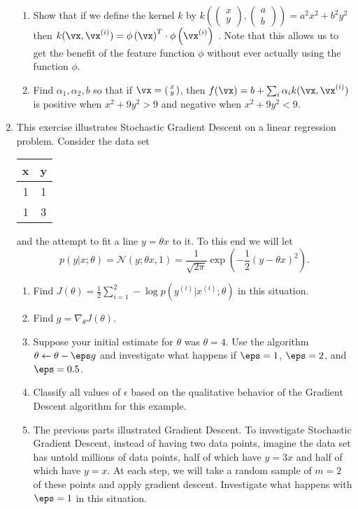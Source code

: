 \documentclass{article}
\begin{document}
\begin{enumerate}
\begin{enumerate}
    \item Show that if we define the kernel $k$ by $k\left( 
                                                     \left( \begin{smallmatrix} x \\ y \end{smallmatrix} \right),
                                                     \left( \begin{smallmatrix} a \\ b \end{smallmatrix} \right) \right)
                            = a^2x^2 + b^2y^2$ then $k(\vx, \vx^{(i)}) = \phi\left(\vx\right)^T \cdot \phi\left(\vx^{(i)}\right)$ . Note that this allows us to get the benefit of the feature function $\phi$ without ever actually using the function $\phi$.
    \item Find $\alpha_1, \alpha_2, b$ so that if $\vx = \left( \begin{smallmatrix} x \\ y \end{smallmatrix} \right)$, 
          then $f(\vx) = b + \sum_i \alpha_i k( \vx , \vx^{(i)})$ is positive when $x^2 + 9y^2 > 9$ and negative when  $x^2 + 9y^2 < 9$.
\end{enumerate}

\item \label{ML_ex_SGD} 
This exercise illustrates Stochastic Gradient Descent on a linear regression problem. Consider the data set 
\begin{tabular}{c|c}
    x & y \\
    \hline
    1 & 1 \\
    1 & 3 
\end{tabular}
and the attempt to fit a line $y = \theta x$ to it. To this end we will let 
$$p(y|x;\theta) = \mathcal{N}(y;\theta x, 1) = \frac{1}{\sqrt{2\pi}}\exp\left(-\frac12(y-\theta x)^2\right).$$
\begin{enumerate}
    \item Find $J(\theta) = \frac12 \sum_{i=1}^2 -\log p(y^{(i)} | x^{(i)}; \theta)$ in this situation.
    \item Find $g = \nabla_\theta J(\theta)$.
    \item Suppose your initial estimate for $\theta$ was $\theta = 4$. Use the algorithm $\theta \leftarrow \theta - \eps g$ and investigate what happens if $\eps = 1$, $\eps = 2$, and $\eps = 0.5$.
    \item Classify all values of $\epsilon$ based on the qualitative behavior of the Gradient Descent algorithm for this example. 
    \item The previous parts illustrated Gradient Descent. To investigate Stochastic Gradient Descent, instead of having two data points, imagine the data set has untold millions of data points, half of which have $y = 3x$ and half of which have $y = x$. At each step, we will take a random sample of $m = 2$ of these points and apply gradient descent. Investigate what happens with $\eps = 1$ in this situation.
\end{enumerate}


\end{enumerate}
\end{document}
